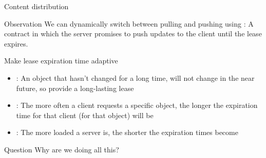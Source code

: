 \begin{slide}{Content distribution}
  \vspace*{-6pt}
  \begin{block}{Observation} 
    We can dynamically switch between pulling and pushing using : A contract in which the server
    promises to push updates to the client until the lease expires.
  \end{block}
  \begin{alertblock}{Make lease expiration time adaptive}
    \begin{itemize}
    \item{}: An object that hasn't changed for a long time, will not change in the near
      future, so provide a long-lasting lease
    \item{}: The more often a client requests a specific object, the longer
      the expiration time for that client (for that object) will be
    \item{}: The more loaded a server is, the shorter the expiration times become
    \end{itemize}
  \end{alertblock}
  \onslide
  \begin{alertblock}{Question}
    Why are we doing all this?  
  \end{alertblock}
\end{slide}
